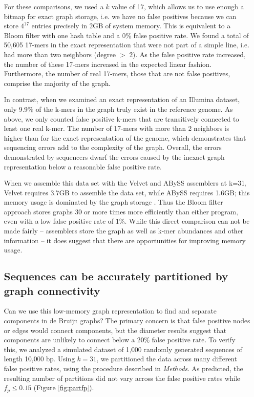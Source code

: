 \documentclass{pnastwo}
\begin{document}
\begin{article}
For these comparisons, we used a $k$ value of 17, which allows us to
use enough a bitmap for exact graph storage, i.e. we have no
false positives because we can store $4^{17}$ entries precisely in
2GB of system memory. This is equivalent to a Bloom filter with one 
hash table and a 0\% false positive rate.
We found a
total of 50,605 17-mers in the exact representation that were not part
of a simple line, i.e. had more than two neighbors (degree $>$ 2). As
the false positive rate increased, the number of these 17-mers
increased in the expected linear fashion.
Furthermore, the
number of real 17-mers, those that are not false positives,
comprise the majority of the graph.

In contrast, when we examined an exact representation of an Illumina
dataset, only 9.9\% of the k-mers in the graph truly exist in the
reference genome.  As above, we only counted false positive k-mers
that are transitively connected to least one real k-mer. The number of
17-mers with more than 2 neighbors is higher than for the exact
representation of the genome, which demonstrates that sequencing
errors add to the complexity of the graph. Overall, the
errors demonstrated by sequencers dwarf the errors caused by the
inexact graph representation below a reasonable false positive rate.

When we assemble this data set with the Velvet and ABySS assemblers at
k=31, Velvet requires 3.7GB to assemble the data set,
while ABySS requires 1.6GB; this memory usage is dominated by the
graph storage \cite{zerbinothesis}. Thus the Bloom filter approach stores graphs 30 or
more times more efficiently than either program, even with a low false
positive rate of 1\%.  While this direct comparison can not be made fairly -- assemblers store the graph as well as k-mer abundances and other information -- it does suggest that there are opportunities for improving memory usage.

\subsection{Sequences can be accurately partitioned by graph connectivity}


Can we use this low-memory graph representation to find and separate
components in de Bruijn graphs?  The primary concern is that false positive
nodes or edges would connect components, but the diameter results suggest that
components are unlikely to connect below a 20\% false positive rate.
To verify this, we analyzed a simulated dataset of 1,000
randomly generated sequences of length 10,000 bp.  Using $k=31$,
we partitioned the data across many different false positive rates,
using the procedure described in \emph{Methods}. As predicted, the
resulting number of partitions did not vary across the false positive
rates while $f_p \le 0.15$ (Figure \ref{fig:partfp}).


\end{article}
\end{document}
